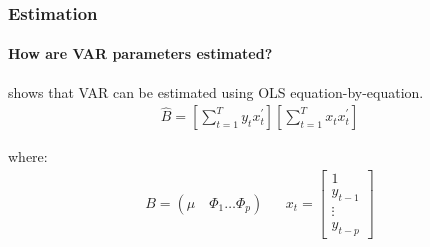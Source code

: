 \begin{frame}
    \frametitle{Estimation}
    \framesubtitle{How are VAR parameters estimated?}

    \cite[257-258]{ghysels_2018_applied} shows that VAR can be estimated using OLS equation-by-equation.
    \begin{align*}
        \hat{B}=\left[\sum_{t=1}^T y_t x_t^{\prime}\right]\left[\sum_{t=1}^T x_t x_t^{\prime}\right]
    \end{align*}

    where: \begin{align*}
        B =(\mu \quad \Phi_1\ldots\Phi_p) &  & x_t=
        \begin{bmatrix}
            1
            \\ y_{t-1}
            \\ \vdots
            \\ y_{t-p}
        \end{bmatrix}
    \end{align*}
\end{frame}